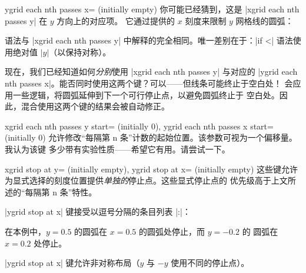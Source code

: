 \begin{pgfplotskey}{ygrid each nth passes x= (initially empty)}
    你可能已经猜到，这是 |xgrid each nth passes y| 在 $y$ 方向上的对应项。
    它通过提供的 $x$ 刻度来限制 $y$ 网格线的圆弧：
\begin{codeexample}[]
\begin{tikzpicture}
\begin{smithchart}[
    xtick={0.2,0.5,1,2,5},
    ytick={
        0,
         0.2, 0.5, 1, 2, 5,
        -0.2,-0.5,-1,-2,-5
    },
    ygrid each nth passes x={0.2,1:2},
]
    \end{smithchart}
\end{tikzpicture}
\end{codeexample}
    语法与 |xgrid each nth passes y| 中解释的完全相同。唯一差别在于：|if <|
    语法使用绝对值 $|y|$（以保持对称）。
\end{pgfplotskey}

现在，我们已经知道如何\emph{分别}使用 |xgrid each nth passes y| 与对应的
|ygrid each nth passes x|。能否同时使用这两个键？可以——但线条可能终止于空白处！
\PGFPlots{} 会应用一些逻辑，将圆弧延伸到下一个可行停止点，以避免圆弧终止于
空白处。因此，混合使用这两个键的结果会被自动修正。

\begin{pgfplotskeylist}{%
    xgrid each nth passes y start= (initially 0),
    ygrid each nth passes x start= (initially 0)%
}
    允许修改“每隔第 n 条”计数的起始位置。该参数可视为一个偏移量。我认为该键
    多少带有实验性质——希望它有用。请尝试一下。
\end{pgfplotskeylist}

\begin{pgfplotskeylist}{%
    xgrid stop at y= (initially empty),
    ygrid stop at x= (initially empty)%
}
    这些键允许为显式选择的刻度位置提供\emph{单独的}停止点。这些显式停止点的
    优先级高于上文所述的“每隔第 n 条”特性。

    |ygrid stop at x| 键接受以逗号分隔的条目列表 |:|：
\begin{codeexample}[]
\begin{tikzpicture}
\begin{smithchart}[
    ygrid stop at x={0.5:0.5,-0.2:0.2}
]
    \end{smithchart}
\end{tikzpicture}
\end{codeexample}
    \noindent 在本例中，$y=0.5$ 的圆弧在 $x=0.5$ 的圆弧处停止，而 $y=-0.2$ 的
    圆弧在 $x=0.2$ 处停止。

    |ygrid stop at x| 键允许非对称布局（$y$ 与 $-y$ 使用不同的停止点）。
\end{pgfplotskeylist}
\endgroup
